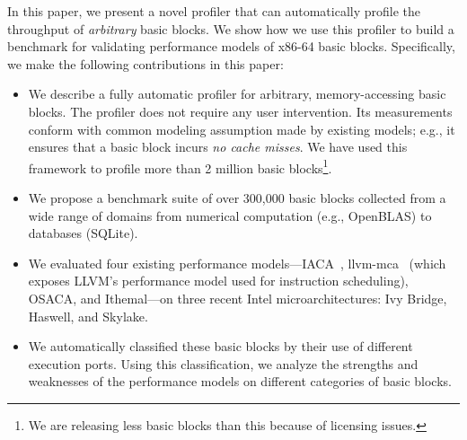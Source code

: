 In this paper, we present a novel profiler that can automatically
profile the throughput of \textit{arbitrary} basic blocks.
We show how we use this profiler to build a benchmark for validating
performance models of x86-64 basic blocks.
Specifically, we make the following contributions in this paper:
\begin{itemize}
    \item We describe a fully automatic profiler
    for arbitrary, memory-accessing basic blocks.
    The profiler does not require any user intervention.
    Its measurements conform with common
    modeling assumption made by existing models;
    e.g., it ensures that a basic block incurs
    \textit{no cache misses}.
    We have used this framework to profile more than 2 million basic blocks\footnote{
    We are releasing less basic blocks than this because of licensing issues.
    }.
    
    \item We propose a benchmark suite of over 300,000 basic blocks collected from a wide range of domains from numerical computation (e.g., OpenBLAS) to databases (SQLite).
    
    \item We evaluated four existing performance models---IACA~\cite{iaca}, llvm-mca~\cite{llvm-mca} (which exposes LLVM’s performance model used for instruction scheduling), OSACA\cite{osaca}, and Ithemal\cite{ithemal}---on three recent Intel microarchitectures:
    Ivy Bridge, Haswell, and Skylake.

    \item We automatically classified these basic blocks
    by their use of different execution ports.
    Using this classification,
    we analyze the strengths and weaknesses of 
    the performance models on different categories of basic blocks.
    
\end{itemize}